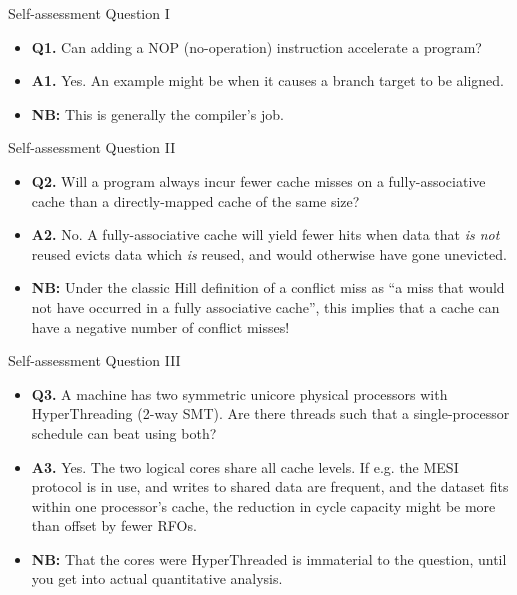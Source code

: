 \documentclass{beamer}
\begin{document}
\begin{frame}{Self-assessment Question I}
\begin{itemize}
\item \textbf{Q1.} Can adding a NOP (no-operation) instruction accelerate a program?
\item \textbf{A1.} Yes. An example might be when it causes a branch target to 
 be aligned.
\item \textbf{NB:} This is generally the compiler's job.
\end{itemize}
\end{frame}

\begin{frame}{Self-assessment Question II}
\begin{itemize}
\item \textbf{Q2.} Will a program always incur fewer cache misses on a fully-associative
	cache than a directly-mapped cache of the same size?
\item \textbf{A2.} No. A fully-associative cache will yield fewer hits when
  data that \textit{is not} reused evicts data which \textit{is} reused, and
  would otherwise have gone unevicted.
\item \textbf{NB:} Under the classic Hill definition of a conflict miss as ``a
  miss that would not have occurred in a fully associative cache'', this
  implies that a cache can have a negative number of conflict misses!
\end{itemize}
\end{frame}

\begin{frame}{Self-assessment Question III}
\begin{itemize}
\item \textbf{Q3.} A machine has two symmetric unicore physical processors with HyperThreading
	(2-way SMT). Are there threads such that a single-processor
	schedule can beat using both?
\item \textbf{A3.} Yes. The two logical cores share all cache levels. If e.g.
	the MESI protocol is in use, and writes to shared data are frequent,
	and the dataset fits within one processor's cache, the reduction in
	cycle capacity might be more than offset by fewer RFOs. 
\item \textbf{NB:} That the cores were HyperThreaded is immaterial to the
	question, until you get into actual quantitative analysis.
\end{itemize}
\end{frame}
\end{document}
